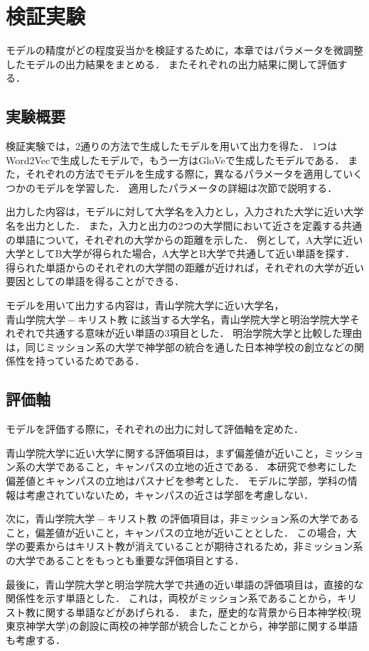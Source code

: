 \chapter{検証実験}
モデルの精度がどの程度妥当かを検証するために，本章ではパラメータを微調整したモデルの出力結果をまとめる．
またそれぞれの出力結果に関して評価する．

\section{実験概要}
検証実験では，2通りの方法で生成したモデルを用いて出力を得た．
1つはWord2Vecで生成したモデルで，もう一方はGloVeで生成したモデルである．
また，それぞれの方法でモデルを生成する際に，異なるパラメータを適用していくつかのモデルを学習した．
適用したパラメータの詳細は次節で説明する．

出力した内容は，モデルに対して大学名を入力とし，入力された大学に近い大学名を出力とした．
また，入力と出力の2つの大学間において近さを定義する共通の単語について，それぞれの大学からの距離を示した．
例として，A大学に近い大学としてB大学が得られた場合，A大学とB大学で共通して近い単語を探す．
得られた単語からのそれぞれの大学間の距離が近ければ，それぞれの大学が近い要因としての単語を得ることができる．

モデルを用いて出力する内容は，青山学院大学に近い大学名， $ 青山学院大学 - キリスト教 $ に該当する大学名，青山学院大学と明治学院大学それぞれで共通する意味が近い単語の3項目とした．
明治学院大学と比較した理由は，同じミッション系の大学で神学部の統合を通した日本神学校の創立などの関係性を持っているためである．

\section{評価軸}
モデルを評価する際に，それぞれの出力に対して評価軸を定めた．

青山学院大学に近い大学に関する評価項目は，まず偏差値が近いこと，ミッション系の大学であること，キャンパスの立地の近さである．
本研究で参考にした偏差値とキャンパスの立地はパスナビ\cite{passNavi}を参考とした．
モデルに学部，学科の情報は考慮されていないため，キャンパスの近さは学部を考慮しない．

次に，$ 青山学院大学 - キリスト教 $ の評価項目は，非ミッション系の大学であること，偏差値が近いこと，キャンパスの立地が近いこととした．
この場合，大学の要素からはキリスト教が消えていることが期待されるため，非ミッション系の大学であることをもっとも重要な評価項目とする．

最後に，青山学院大学と明治学院大学で共通の近い単語の評価項目は，直接的な関係性を示す単語とした．
これは，両校がミッション系であることから，キリスト教に関する単語などがあげられる．
また，歴史的な背景から日本神学校(現 東京神学大学)の創設に両校の神学部が統合したことから，神学部に関する単語も考慮する．

